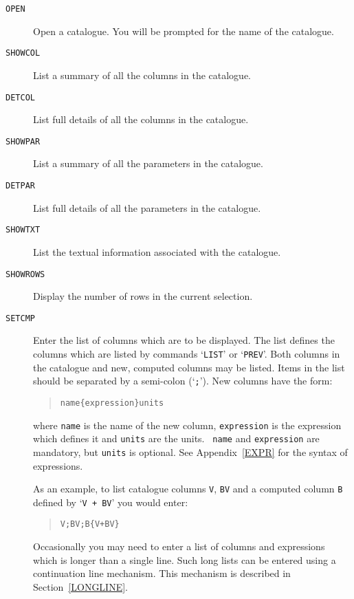 \documentclass[twoside,11pt]{article}
\renewcommand{\_}{\texttt{\symbol{95}}}
\begin{document}
\begin{description}

  \item[ {\tt OPEN} ] Open a catalogue. You will be prompted for the
   name of the catalogue.

  \item[ {\tt SHOWCOL} ] List a summary of all the columns in the
   catalogue.

  \item[ {\tt DETCOL} ] List full details of all the columns in the
   catalogue.

  \item[ {\tt SHOWPAR} ] List a summary of all the parameters in the
   catalogue.

  \item[ {\tt DETPAR} ] List full details of all the parameters in the
   catalogue.

  \item[ {\tt SHOWTXT} ] List the textual information associated with
   the catalogue.

  \item[ {\tt SHOWROWS} ] Display the number of rows in the current
   selection.

  \item[ {\tt SETCMP} ] Enter the list of columns which are to be
   displayed.  The list defines the columns which are listed by commands
   `{\tt LIST}' or `{\tt PREV}'. Both columns in the catalogue and new,
   computed columns may be listed.  Items in the list should be separated
   by a semi-colon (`{\tt ;}').  New columns have the form:

  \begin{verse}
   {\tt name\{expression\}units}
  \end{verse}

   where {\tt name} is the name of the new column, {\tt expression} is
   the expression which defines it and {\tt units} are the units.  {\tt
   name} and {\tt expression} are mandatory, but {\tt units} is
   optional. See Appendix~\ref{EXPR} for the syntax of expressions.

   As an example, to list catalogue columns {\tt V}, {\tt B\_V} and a 
   computed column {\tt B} defined by `{\tt V + B\_V}' you would enter:

  \begin{verse}
   {\tt V;B\_V;B\{V+B\_V\} }
  \end{verse}

   Occasionally you may need to enter a list of columns and expressions
   which is longer than a single line.  Such long lists can be entered
   using a continuation line mechanism.  This mechanism is described in
   Section~\ref{LONGLINE}.
  

\end{description}
\end{document}
